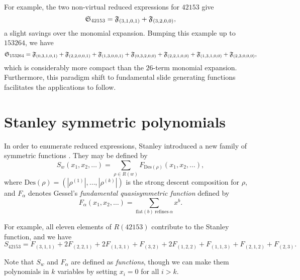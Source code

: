 \documentclass[11pt]{amsart}
\theoremstyle{definition}
\theoremstyle{remark}
\numberwithin{equation}{section}
\newcommand{\R}{\ensuremath{R}}
\newcommand{\schubert}{\ensuremath\mathfrak{S}}
\newcommand{\fund}{\ensuremath\mathfrak{F}}
\newcommand{\stanley}{\ensuremath{S}}
\begin{document}
For example, the two non-virtual reduced expressions for $42153$ give
\begin{displaymath}
  \schubert_{42153} = \fund_{(3,1,0,1)} + \fund_{(3,2,0,0)},
\end{displaymath}
a slight savings over the monomial expansion. Bumping this example up to $153264$, we have
\begin{displaymath}
  \schubert_{153264} = \fund_{(0,3,1,0,1)} + \fund_{(2,2,0,0,1)} + \fund_{(1,3,0,0,1)} + \fund_{(0,3,2,0,0)} + \fund_{(2,2,1,0,0)} + \fund_{(1,3,1,0,0)} + \fund_{(2,3,0,0,0)},
\end{displaymath}
which is considerably more compact than the $26$-term monomial expansion. Furthermore, this paradigm shift to fundamental slide generating functions facilitates the applications to follow.


%
\section{Stanley symmetric polynomials}
%
\label{sec:stanley}

In order to enumerate reduced expressions, Stanley introduced a new family of symmetric functions \cite{Sta84}. They may be defined by
\begin{equation}
   \stanley_w(x_1,x_2,\ldots)  = \sum_{\rho \in \R(w)} F_{\mathrm{Des}(\rho)}(x_1,x_2,\ldots),
  \label{e:stanley}
\end{equation}
where $\mathrm{Des}(\rho) = (|\rho^{(1)}|,\ldots,|\rho^{(k)}|)$ is the strong descent composition for $\rho$, and $F_{\alpha}$ denotes Gessel's \emph{fundamental quasisymmetric function} \cite{Ges84} defined by
\begin{equation}
  F_{\alpha}(x_1,x_2,\ldots) = \sum_{\mathrm{flat}(b) \ \mathrm{refines} \ \alpha} x^{b}.
  \label{e:gessel}
\end{equation}

For example, all eleven elements of $\R(42153)$ contribute to the Stanley function, and we have
\begin{displaymath}
  \stanley_{42153} = F_{(3,1,1)} + 2 F_{(2,2,1)} + 2 F_{(1,3,1)} + F_{(3,2)}  + 2 F_{(1,2,2)} + F_{(1,1,3)} + F_{(2,1,2)} + F_{(2,3)} .
\end{displaymath}

Note that $\stanley_w$ and $F_{\alpha}$ are defined as \emph{functions}, though we can make them polynomials in $k$ variables by setting $x_i=0$ for all $i>k$.
\end{document}
